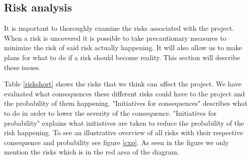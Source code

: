 \subsection{Risk analysis}
\label{risk}
It is important to thoroughly examine the risks associated with the project. When a risk is uncovered it is possible to take precautionary measures to minimize the risk of said risk actually happening. It will also allow us to make plans for what to do if a risk should become reality. This section will describe these issues.

Table \ref{riskshort} shows the risks that we think can affect the project. 
We have evaluated what consequences these different risks could have to the project and the probability of them happening.
"Initiatives for consequences" describes what to do in order to lower the severity of the consequence.
"Initiatives for probability" explains what initiatives are taken to reduce the probability of the risk happening. 
To see an illustrative overview of all risks with their respective consequence and probability see figure \ref{cxp}. 
As seen in the figure we only mention the risks which is in the red area of the diagram.

